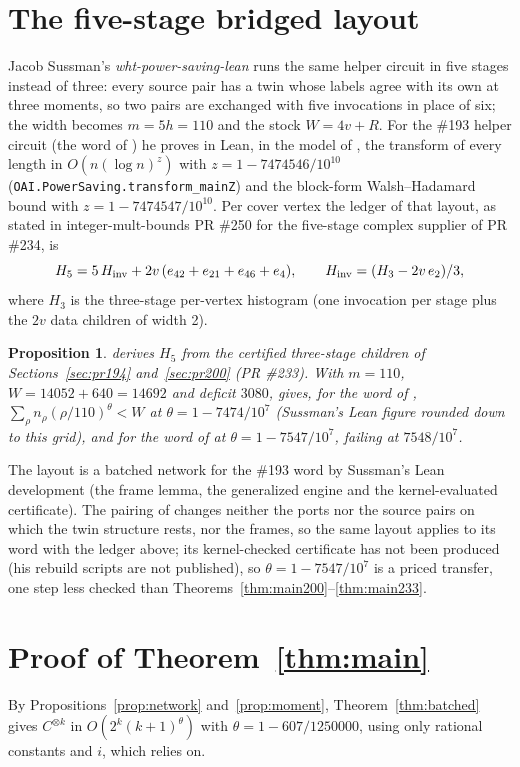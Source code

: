 \documentclass[11pt]{article}
\newtheorem{proposition}[theorem]{Proposition}
\theoremstyle{definition}
\begin{document}
\section{The five-stage bridged layout}\label{sec:five}
Jacob Sussman's \emph{wht-power-saving-lean} \cite{sussman} runs the same
helper circuit in five stages instead of three: every source pair has a twin
whose labels agree with its own at three moments, so two pairs are exchanged
with five invocations in place of six; the width becomes $m=5h=110$ and the
stock $W=4v+R$. For the \#193 helper circuit (the word of \cite{pr194}) he
proves in Lean, in the model of \cite{oai-dft}, the transform of every length
in $O(n(\log n)^z)$ with $z=1-7474546/10^{10}$
(\texttt{OAI.PowerSaving.transform\_mainZ}) and the block-form
Walsh--Hadamard bound with $z=1-7474547/10^{10}$. Per cover vertex the ledger
of that layout, as stated in integer-mult-bounds PR \#250 for the five-stage
complex supplier of PR \#234, is
\[
 H_5 = 5\,H_{\rm inv} + 2v\,(e_{42}+e_{21}+e_{46}+e_{4}),\qquad
 H_{\rm inv}=(H_3-2v\,e_2)/3,
\]
where $H_3$ is the three-stage per-vertex histogram (one invocation per
stage plus the $2v$ data children of width 2).

\begin{proposition}\label{prop:five}
 derives $H_5$ from the certified
three-stage children of Sections~\ref{sec:pr194} and~\ref{sec:pr200} (PR \#233).
With $m=110$, $W=14052+640=14692$ and deficit $3080$,
 gives, for the word of \cite{pr194},
$\sum_\rho n_\rho(\rho/110)^\theta<W$ at $\theta=1-7474/10^{7}$ (Sussman's
Lean figure rounded down to this grid), and for the word of \cite{pr233}
at $\theta=1-7547/10^{7}$, failing at $7548/10^{7}$.
\end{proposition}

The layout is a batched network for the \#193 word by Sussman's Lean
development (the frame lemma, the generalized engine and the kernel-evaluated
certificate). The pairing of \cite{pr233} changes neither the ports nor the
source pairs on which the twin structure rests, nor the frames, so the same
layout applies to its word with the ledger above; its kernel-checked
certificate has not been produced (his rebuild scripts are not published),
so $\theta=1-7547/10^{7}$ is a priced transfer, one step less checked than
Theorems~\ref{thm:main200}--\ref{thm:main233}.

\section{Proof of Theorem~\ref{thm:main}}\label{sec:proof}
By Propositions~\ref{prop:network} and~\ref{prop:moment},
Theorem~\ref{thm:batched} gives $C^{\otimes k}$ in $O(2^k(k+1)^\theta)$ with
$\theta=1-607/1250000$, using only rational constants and $i$, which \cite[\S5.3]{oai-dft} relies on.
\end{document}
